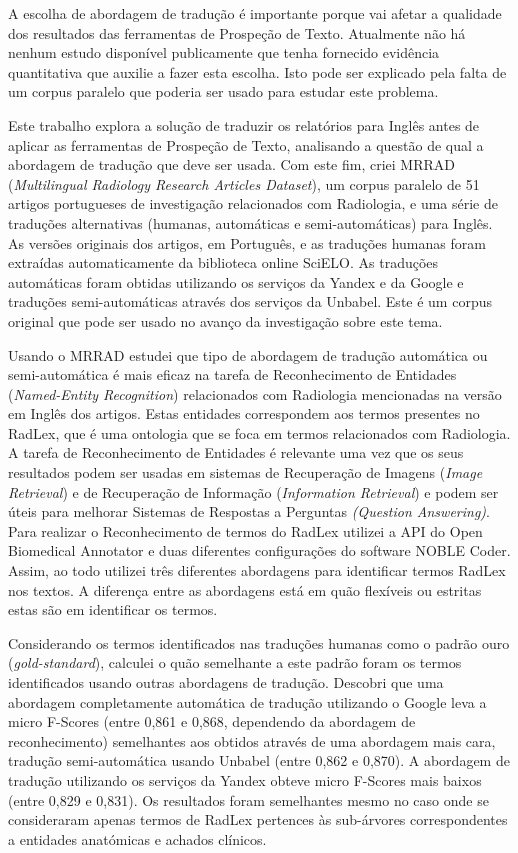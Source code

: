 \begin{abstractspt}
A escolha de abordagem de tradução é importante porque vai afetar a qualidade dos resultados das ferramentas de Prospeção de Texto. Atualmente não há nenhum estudo disponível publicamente que tenha fornecido evidência quantitativa que auxilie a fazer esta escolha. Isto pode ser explicado pela falta de um corpus paralelo que poderia ser usado para estudar este problema. 

Este trabalho explora a solução de traduzir os relatórios para Inglês antes de aplicar as ferramentas de Prospeção de Texto, analisando a questão de qual a abordagem de tradução que deve ser usada. Com este fim, criei MRRAD (\textit{Multilingual Radiology Research Articles Dataset}), um corpus paralelo de 51 artigos portugueses de investigação relacionados com Radiologia, e uma série de traduções alternativas (humanas, automáticas e semi-automáticas) para Inglês. As versões originais dos artigos, em Português, e as traduções humanas foram extraídas automaticamente da biblioteca online SciELO. As traduções automáticas foram obtidas utilizando os serviços da Yandex e da Google e traduções semi-automáticas através dos serviços da Unbabel. Este é um corpus original que pode ser usado no avanço da investigação sobre este tema.

Usando o MRRAD estudei que tipo de abordagem de tradução automática ou semi-automática é mais eficaz na tarefa de Reconhecimento de Entidades (\textit{Named-Entity Recognition}) relacionados com Radiologia mencionadas na versão em Inglês dos artigos. Estas entidades correspondem aos termos presentes no RadLex, que é uma ontologia que se foca em termos relacionados com Radiologia. A tarefa de Reconhecimento de Entidades é relevante uma vez que os seus resultados podem ser usadas em sistemas de Recuperação de Imagens (\textit{Image Retrieval}) e de Recuperação de Informação (\textit{Information Retrieval}) e podem ser úteis para melhorar Sistemas de Respostas a Perguntas \textit{(Question Answering)}. Para realizar o Reconhecimento de termos do RadLex utilizei a API do Open Biomedical Annotator e duas diferentes configurações do software NOBLE Coder. Assim, ao todo utilizei três diferentes abordagens para identificar termos RadLex nos textos. A diferença entre as abordagens está em quão flexíveis ou estritas estas são em identificar os termos. 

Considerando os termos identificados nas traduções humanas como o padrão ouro (\textit{gold-standard}), calculei o quão semelhante a este padrão foram os termos identificados usando outras abordagens de tradução. Descobri que uma abordagem completamente automática de tradução utilizando o Google leva a micro F-Scores (entre 0,861 e 0,868, dependendo da abordagem de reconhecimento) semelhantes aos obtidos através de uma abordagem mais cara, tradução semi-automática usando Unbabel (entre 0,862 e 0,870). A abordagem de tradução utilizando os serviços da Yandex obteve micro F-Scores mais baixos (entre 0,829 e 0,831). Os resultados foram semelhantes mesmo no caso onde se consideraram apenas termos de RadLex pertences às sub-árvores correspondentes a entidades anatómicas e achados clínicos. 


\end{abstractspt}
